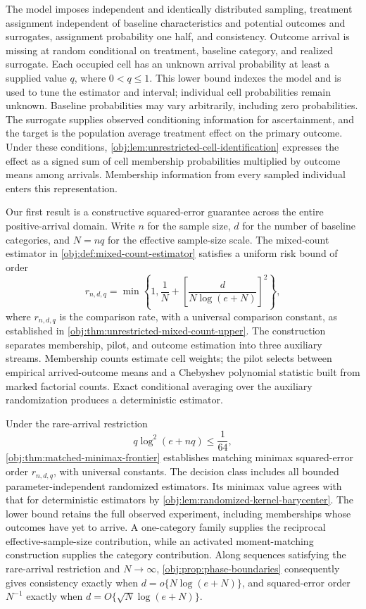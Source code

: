 \documentclass[11pt]{article}
\begin{document}
The model imposes independent and identically distributed sampling, treatment assignment independent of baseline characteristics and potential outcomes and surrogates, assignment probability one half, and consistency. Outcome arrival is missing at random conditional on treatment, baseline category, and realized surrogate. Each occupied cell has an unknown arrival probability at least a supplied value \(q\), where \(0<q\le1\). This lower bound indexes the model and is used to tune the estimator and interval; individual cell probabilities remain unknown. Baseline probabilities may vary arbitrarily, including zero probabilities. The surrogate supplies observed conditioning information for ascertainment, and the target is the population average treatment effect on the primary outcome. Under these conditions, \cref{obj:lem:unrestricted-cell-identification} expresses the effect as a signed sum of cell membership probabilities multiplied by outcome means among arrivals. Membership information from every sampled individual enters this representation.

Our first result is a constructive squared-error guarantee across the entire positive-arrival domain. Write \(n\) for the sample size, \(d\) for the number of baseline categories, and \(N=nq\) for the effective sample-size scale. The mixed-count estimator in \cref{obj:def:mixed-count-estimator} satisfies a uniform risk bound of order
\[
r_{n,d,q}
=
\min\left\{1,\frac1N+
\left[\frac{d}{N\log(e+N)}\right]^2\right\},
\]
where \(r_{n,d,q}\) is the comparison rate, with a universal comparison constant, as established in \cref{obj:thm:unrestricted-mixed-count-upper}. The construction separates membership, pilot, and outcome estimation into three auxiliary streams. Membership counts estimate cell weights; the pilot selects between empirical arrived-outcome means and a Chebyshev polynomial statistic built from marked factorial counts. Exact conditional averaging over the auxiliary randomization produces a deterministic estimator.

Under the rare-arrival restriction
\[
q\log^2(e+nq)\le\frac1{64},
\]
\cref{obj:thm:matched-minimax-frontier} establishes matching minimax squared-error order \(r_{n,d,q}\), with universal constants. The decision class includes all bounded parameter-independent randomized estimators. Its minimax value agrees with that for deterministic estimators by \cref{obj:lem:randomized-kernel-barycenter}. The lower bound retains the full observed experiment, including memberships whose outcomes have yet to arrive. A one-category family supplies the reciprocal effective-sample-size contribution, while an activated moment-matching construction supplies the category contribution. Along sequences satisfying the rare-arrival restriction and \(N\to\infty\), \cref{obj:prop:phase-boundaries} consequently gives consistency exactly when \(d=o\{N\log(e+N)\}\), and squared-error order \(N^{-1}\) exactly when \(d=O\{\sqrt N\log(e+N)\}\).
\end{document}

